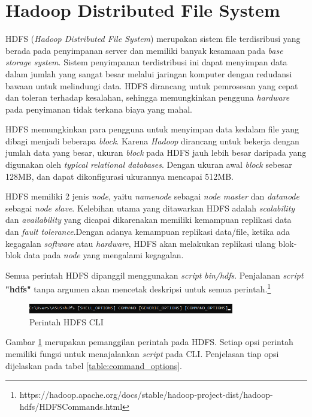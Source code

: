 \section{Hadoop Distributed File System}
\label{sec:hdfs}
HDFS (\textit{Hadoop Distributed File System}) merupakan sistem file terdisribusi yang berada pada penyimpanan server dan memiliki banyak kesamaan pada \textit{base storage system}. Sistem penyimpanan terdistribusi ini dapat menyimpan data dalam jumlah yang sangat besar melalui jaringan komputer dengan redudansi bawaan untuk melindungi data. HDFS dirancang untuk pemrosesan yang cepat dan toleran terhadap kesalahan, sehingga memungkinkan pengguna \textit{hardware} pada penyimanan tidak terkana biaya yang mahal.

HDFS memungkinkan para pengguna untuk menyimpan data kedalam file yang dibagi menjadi beberapa \textit{block}. Karena \textit{Hadoop} dirancang untuk bekerja dengan jumlah data yang besar, ukuran \textit{block} pada HDFS jauh lebih besar daripada yang digunakan oleh \textit{typical relational databases}. Dengan ukuran awal \textit{block} sebesar 128MB, dan dapat dikonfigurasi ukurannya mencapai 512MB.\cite{sam:16:hadoop}

HDFS memiliki 2 jenis \textit{node}, yaitu \textit{namenode} sebagai \textit{node master} dan \textit{datanode} sebagai \textit{node slave}. Kelebihan utama yang ditawarkan HDFS adalah \textit{scalability} dan \textit{availability} yang dicapai dikarenakan memiliki kemampuan replikasi data dan \textit{fault tolerance}.Dengan adanya kemampuan replikasi data/file, ketika ada kegagalan \textit{software }atau \textit{hardware}, HDFS akan melakukan replikasi ulang blok-blok data pada \textit{node} yang mengalami kegagalan.\cite{alex:14:hadoop}

Semua perintah HDFS dipanggil menggunakan \textit{script} \textit{bin/hdfs}. Penjalanan \textit{script} \textbf{"hdfs"} tanpa argumen akan mencetak deskripsi untuk semua perintah.\footnote{https://hadoop.apache.org/docs/stable/hadoop-project-dist/hadoop-hdfs/HDFSCommands.html}
\begin{figure}[H]
	\centering
	\includegraphics[width=0.8\textwidth]{Gambar/hdfs2.png}
	\caption{Perintah HDFS CLI}
	\label{fig:hdfs}
\end{figure}
Gambar \ref{fig:hdfs} merupakan pemanggilan perintah pada HDFS. Setiap opsi perintah memiliki fungsi untuk menajalankan \textit{script} pada CLI. Penjelasan tiap opsi dijelaskan pada tabel \ref{table:command_options}.  

